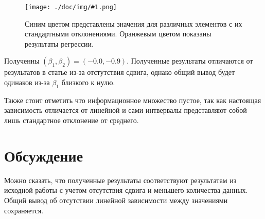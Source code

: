 \documentclass[a4paper,12pt]{article}
\newcommand{\plot}[3]{
    \begin{figure}[H]
        \begin{center}
            \texttt{[image: ./doc/img/\#1.png]}
            \caption{#2}
            \label{#3}
        \end{center}
    \end{figure}
}
\begin{document}
    \plot{Se Sr Y Nb Mo}{
        Синим цветом представлены значения для различных элементов с их стандартными отклонениями.
        Оранжевым цветом показаны результаты регрессии.
    }{linreg}

    
    Полученны $(\beta_1, \beta_2) = (-0.0, -0.9)$. Полученные результаты отличаются от результатов в статье из-за 
    отстутствия сдвига, однако общий вывод будет одинаков из-за $\beta_1$ близкого к нулю.

    Также стоит отметить что информационное множество пустое, так как настоящая зависимость отличается от линейной
    и сами интвервалы представляют собой лишь стандартное отклонение от среднего.

    \section{Обсуждение}
    \quad Можно сказать, что полученные результаты соответствуют результатам из исходной работы 
    с учетом отсутствия сдвига и меньшего количества данных. Общий вывод об отсутствии линейной 
    зависимости между значениями сохраняется.
\end{document}
